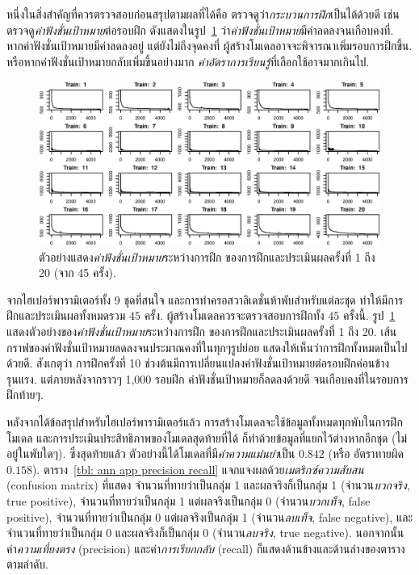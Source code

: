 หนึ่งในสิ่งสำคัญที่ควรตรวจสอบก่อนสรุปตามผลที่ได้คือ ตรวจดูว่า\textit{กระบวนการฝึก}เป็นได้ด้วยดี เช่น ตรวจดู\textit{ค่าฟังชั่นเป้าหมาย}ต่อรอบฝึก ดังแสดงในรูป~\ref{fig: ann app train mamo 1-20} 
ว่า\textit{ค่าฟังชั่นเป้าหมาย}มีค่าลดลงจนเกือบคงที่.
หากค่าฟังชั่นเป้าหมายมีค่าลดลงอยู่ แต่ยังไม่ถึงจุดคงที่ ผู้สร้างโมเดลอาจจะพิจารณาเพิ่มรอบการฝึกขึ้น.
หรือหากค่าฟังชั่นเป้าหมายกลับเพิ่มขึ้นอย่างมาก \textit{ค่าอัตราการเรียนรู้}ที่เลือกใช้อาจมากเกินไป.

%
\begin{figure}
\begin{center}
\includegraphics[width=5.5in]{04ANN/trainMammoSample.eps}
\end{center}
\caption{ตัวอย่างแสดง\textit{ค่าฟังชั่นเป้าหมาย}ระหว่างการฝึก ของการฝึกและประเมินผลครั้งที่ 1 ถึง 20 (จาก 45 ครั้ง).}
\label{fig: ann app train mamo 1-20}
\end{figure}
%

จากไฮเปอร์พารามิเตอร์ทั้ง 9 ชุดที่สนใจ และการทำครอสวาลิเดชั่นห้าพับสำหรับแต่ละชุด 
ทำให้มีการฝึกและประเมินผลทั้งหมดรวม $45$ ครั้ง.
ผู้สร้างโมเดลควรจะตรวจสอบการฝึกทั้ง $45$ ครั้งนี้.
รูป~\ref{fig: ann app train mamo 1-20} แสดงตัวอย่างของ\textit{ค่าฟังชั่นเป้าหมาย}ระหว่างการฝึก 
ของการฝึกและประเมินผลครั้งที่ 1 ถึง 20.
เส้นกราฟของค่าฟังชั่นเป้าหมายลดลงจนประมาณคงที่ในทุกๆรูปย่อย แสดงให้เห็นว่าการฝึกทั้งหมดเป็นไปด้วยดี.
สังเกตุว่า การฝึกครั้งที่ 10 ช่วงต้นมีการเปลี่ยนแปลงค่าฟังชั่นเป้าหมายต่อรอบฝึกค่อนข้างรุนแรง.
แต่ภายหลังจากราวๆ 1,000 รอบฝึก ค่าฟังชั่นเป้าหมายก็ลดลงด้วยดี จนเกือบคงที่ในรอบการฝึกท้ายๆ.

หลังจากได้ข้อสรุปสำหรับไฮเปอร์พารามิเตอร์แล้ว การสร้างโมเดลจะใช้ข้อมูลทั้งหมดทุกพับในการฝึกโมเดล 
และการประเมินประสิทธิภาพของโมเดลสุดท้ายที่ได้ ก็ทำด้วยข้อมูลที่แยกไว้ต่างหากอีกชุด (ไม่อยู่ในพับใดๆ).
ซึ่งสุดท้ายแล้ว ตัวอย่างนี้ได้โมเดลที่มี\textit{ค่าความแม่นยำ}เป็น $0.842$ (หรือ อัตราทายผิด $0.158$).
ตาราง~\ref{tbl: ann app precision recall} แจกแจงผลด้วย\textit{เมตริกซ์ความสับสน} (confusion matrix)
ที่แสดง 
จำนวนที่ทายว่าเป็นกลุ่ม 1 และผลจริงก็เป็นกลุ่ม 1 (จำนวน\textit{บวกจริง}, true positive), 
จำนวนที่ทายว่าเป็นกลุ่ม 1 แต่ผลจริงเป็นกลุ่ม 0 (จำนวน\textit{บวกเท็จ}, false positive),
จำนวนที่ทายว่าเป็นกลุ่ม 0 แต่ผลจริงเป็นกลุ่ม 1 (จำนวน\textit{ลบเท็จ}, false negative), 
และ 
จำนวนที่ทายว่าเป็นกลุ่ม 0 และผลจริงก็เป็นกลุ่ม 0 (จำนวน\textit{ลบจริง}, true negative).
นอกจากนั้น ค่า\textit{ความเที่ยงตรง} (precision) และค่า\textit{การเรียกกลับ} (recall) ก็แสดงด้านข้างและด้านล่างของตารางตามลำดับ.

